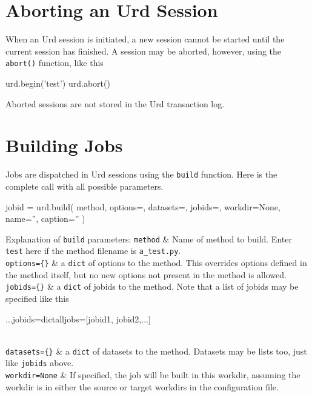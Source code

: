 \section{Aborting an Urd Session}

When an Urd session is initiated, a new session cannot be started
until the current session has finished.  A session may be aborted,
however, using the \texttt{abort()} function, like this
\begin{python}
urd.begin('test')
urd.abort()
\end{python}
Aborted sessions are not stored in the Urd transaction log.




\section{Building Jobs}

Jobs are dispatched in Urd sessions using the \texttt{build} function.
Here is the complete call with all possible parameters.\\[-3ex]
\begin{python}
jobid = urd.build(
    method,
    options={},
    datasets={},
    jobids={},
    workdir=None,
    name='',
    caption=''
)
\end{python}
Explanation of \texttt{build} parameters:
\starttabletwo
\RPtwo \texttt{method} & Name of method to build.  Enter \texttt{test}
    here if the method filename is \texttt{a\_test.py}.\\[2ex]
    
\RPtwo \texttt{options=\{\}} & a \texttt{dict} of options to the method.
    This overrides options defined in the method itself, but no new
    options not present in the method is allowed.\\[2ex]

\RPtwo \texttt{jobids=\{\}} & a \texttt{dict} of jobids to the method.
    Note that a list of jobids may be specified like this\begin{python}
...jobids=dict{alljobs=[jobid1, jobid2,...]}
\end{python}
\\[2ex]

\RPtwo \texttt{datasets=\{\}} & a \texttt{dict} of datasets to the method.
    Datasets may be lists too, just like \texttt{jobids} above.\\[2ex]

\RPtwo \texttt{workdir=None} & If specified, the job will be built in
    this workdir, assuming the workdir is in either the source or target
    workdirs in the configuration file.\\[2ex]

